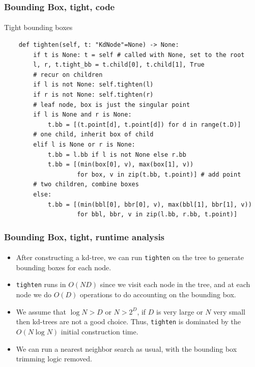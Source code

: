 \documentclass{beamer}                             %
\begin{document}
\begin{frame}[fragile]
\frametitle{Bounding Box, tight, code}
\framesubtitle{}
\begin{algorithm}[H]
  \caption{Tight bounding boxes}
  \begin{verbatim}
    def tighten(self, t: "KdNode"=None) -> None:
        if t is None: t = self # called with None, set to the root 
        l, r, t.tight_bb = t.child[0], t.child[1], True
        # recur on children
        if l is not None: self.tighten(l)
        if r is not None: self.tighten(r)
        # leaf node, box is just the singular point
        if l is None and r is None:
            t.bb = [(t.point[d], t.point[d]) for d in range(t.D)]
        # one child, inherit box of child
        elif l is None or r is None:
            t.bb = l.bb if l is not None else r.bb
            t.bb = [(min(box[0], v), max(box[1], v))
                    for box, v in zip(t.bb, t.point)] # add point
        # two children, combine boxes
        else:
            t.bb = [(min(bbl[0], bbr[0], v), max(bbl[1], bbr[1], v))
                    for bbl, bbr, v in zip(l.bb, r.bb, t.point)]
  \end{verbatim}
\end{algorithm}
\end{frame}

\begin{frame}
\frametitle{Bounding Box, tight, runtime analysis}
\framesubtitle{}
\begin{itemize}[<+->]
  \item After constructing a kd-tree, we can run \texttt{tighten}
    on the tree to generate bounding boxes for each node.
  \item \texttt{tighten} runs in \( O(ND) \) since we
    visit each node in the tree, and at each node we do \( O(D) \)
    operations to do accounting on the bounding box.
  \item We assume that \( \log N > D \) or \( N > 2^D \), if \( D \) is
    very large or \( N \) very small then kd-trees are not a good choice.
    Thus, \texttt{tighten} is dominated by the \( O(N \log N) \) initial
    construction time.
  \item We can run a nearest neighbor search as usual,
    with the bounding box trimming logic removed.
\end{itemize}
\end{frame}
\end{document}
